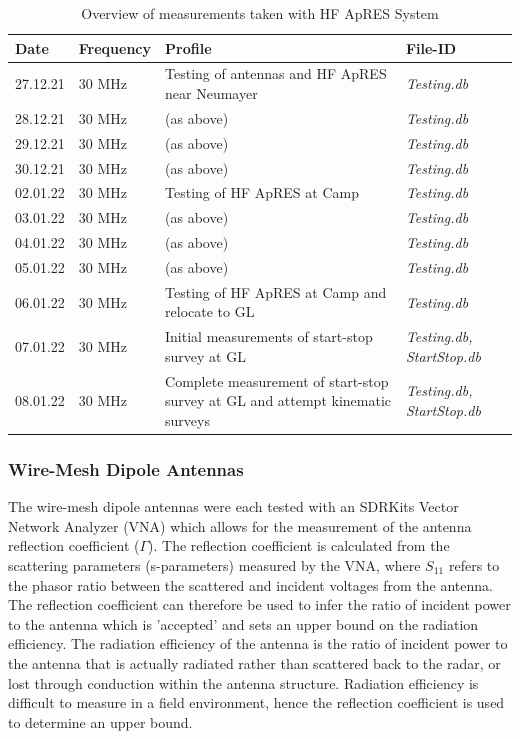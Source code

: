 \documentclass[a4paper,12pt]{article}
\begin{document}
\begin{table}
  \begin{tabular}{m{1.5cm} m{2.25cm} m{7cm} >{\raggedright\arraybackslash}m{3cm}}
    \rowcolor{gray!50}
    Date & Frequency & Profile & File-ID\\
    \hline
    27.12.21 & 30 MHz & Testing of antennas and HF ApRES near Neumayer & \textit{Testing.db} \\
    28.12.21 & 30 MHz & (as above) & \textit{Testing.db} \\
    29.12.21 & 30 MHz & (as above) & \textit{Testing.db} \\
    30.12.21 & 30 MHz & (as above) & \textit{Testing.db} \\
    02.01.22 & 30 MHz & Testing of HF ApRES at Camp & \textit{Testing.db} \\
    03.01.22 & 30 MHz & (as above) & \textit{Testing.db} \\
    04.01.22 & 30 MHz & (as above) & \textit{Testing.db} \\
    05.01.22 & 30 MHz & (as above) & \textit{Testing.db} \\
    06.01.22 & 30 MHz & Testing of HF ApRES at Camp and relocate to GL & \textit{Testing.db} \\
    07.01.22 & 30 MHz & Initial measurements of start-stop survey at GL & \textit{Testing.db, StartStop.db} \\
    08.01.22 & 30 MHz & Complete measurement of start-stop survey at GL and attempt kinematic surveys & \textit{Testing.db, StartStop.db} \\
    \hline
  \end{tabular}
  \label{TableHFApRES}
  \caption{Overview of measurements taken with HF ApRES System} 
\end{table}

\subsubsection*{Wire-Mesh Dipole Antennas}
The wire-mesh dipole antennas were each tested with an SDRKits Vector Network
Analyzer (VNA) which allows for the measurement of the antenna reflection
coefficient ($\Gamma$).  The reflection coefficient is calculated from the
scattering parameters (s-parameters) measured by the VNA, where $S_{11}$ 
refers to the phasor ratio between the scattered and incident voltages from
the antenna.  The reflection coefficient can therefore be used to infer the 
ratio of incident power to the antenna which is 'accepted' and sets an upper
bound on the radiation efficiency.  The radiation efficiency of the antenna
is the ratio of incident power to the antenna that is actually radiated
rather than scattered back to the radar, or lost through conduction within the
antenna structure.  Radiation efficiency is difficult to measure in a field 
environment, hence the reflection coefficient is used to determine an upper
bound.
\end{document}
